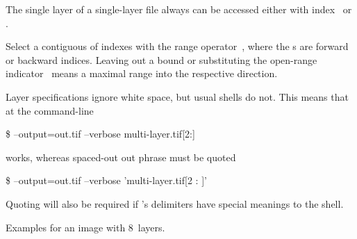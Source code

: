 
The single layer of a single-layer file always can be accessed either with index~ or
.

Select a contiguous  of indexes with the range
operator~, where the \/s are
forward or backward indices.  Leaving out a bound or substituting the open-range
indicator~ means a maximal range into the
respective direction.

Layer specifications ignore white space, but usual shells do not.  This means that at the
command-line

\begin{terminal}
  \$ \app{} --output=out.tif --verbose multi-layer.tif[2:]
\end{terminal}

\noindent works, whereas spaced-out out phrase  must be quoted

\begin{terminal}
  \$ \app{} --output=out.tif --verbose 'multi-layer.tif[2 : ]'
\end{terminal}

Quoting will also be required if \App's delimiters have special meanings to the shell.

\smallskip

Examples for an image with 8~layers.

